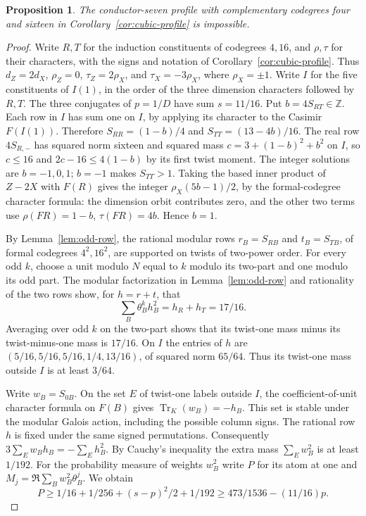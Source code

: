 \documentclass[11pt,a4paper]{article}
\newtheorem{proposition}[theorem]{Proposition}
\numberwithin{equation}{section}
\begin{document}
\begin{proposition}\label{prop:cubic-polar}
The conductor-seven profile with complementary codegrees four and sixteen in Corollary~\ref{cor:cubic-profile} is impossible.
\end{proposition}
\begin{proof}
Write $R,T$ for the induction constituents of codegrees $4,16$, and
$\rho,\tau$ for their characters, with the signs and notation of
Corollary~\ref{cor:cubic-profile}. Thus $d_Z=2d_X$,
$\rho_Z=0$, $\tau_Z=2\rho_X$, and $\tau_X=-3\rho_X$,
where $\rho_X=\pm1$. Write $I$ for the five constituents of $I(1)$,
in the order of the three dimension characters followed by $R,T$.
The three conjugates of $p=1/D$ have sum $s=11/16$.
Put $b=4S_{RT}\in\mathbb Z$. Each row in $I$ has sum one on $I$,
by applying its character to the Casimir $F(I(1))$.
Therefore $S_{RR}=(1-b)/4$ and $S_{TT}=(13-4b)/16$.
The real row $4S_{R,-}$ has squared norm sixteen and squared mass
$c=3+(1-b)^2+b^2$ on $I$, so $c\le16$ and
$2c-16\le4(1-b)$ by its first twist moment. The integer solutions
are $b=-1,0,1$; $b=-1$ makes $S_{TT}>1$.
Taking the based inner product of $Z-2X$ with $F(R)$ gives the integer
$\rho_X(5b-1)/2$, by the formal-codegree character formula: the
dimension orbit contributes zero, and the other two terms use
$\rho(FR)=1-b$, $\tau(FR)=4b$. Hence $b=1$.

By Lemma~\ref{lem:odd-row}, the rational modular rows
$r_B=S_{RB}$ and $t_B=S_{TB}$, of formal codegrees $4^2,16^2$,
are supported on twists of two-power order.
For every odd $k$, choose a unit modulo $N$ equal to $k$ modulo its
two-part and one modulo its odd part. The modular factorization in
Lemma~\ref{lem:odd-row} and rationality of the two rows show, for
$h=r+t$, that
\[
 \sum_B \theta_B^k h_B^2=h_R+h_T=17/16.
\]
Averaging over odd $k$ on the two-part shows that its twist-one mass
minus its twist-minus-one mass is $17/16$.
On $I$ the entries of $h$ are $(5/16,5/16,5/16,1/4,13/16)$, of
squared norm $65/64$. Thus its twist-one mass outside $I$ is at
least $3/64$.

Write $w_B=S_{0B}$. On the set $E$ of twist-one labels outside $I$,
the coefficient-of-unit character formula on $F(B)$ gives
$\operatorname{Tr}_K(w_B)=-h_B$. This set is stable under the
modular Galois action, including the possible column signs.
The rational row $h$ is fixed under the same signed permutations.
Consequently $3\sum_E w_B h_B=-\sum_E h_B^2$. By Cauchy's
inequality the extra mass $\sum_E w_B^2$ is at least $1/192$.
For the probability measure of weights $w_B^2$ write $P$ for its
atom at one and $M_j=\Re\sum_B w_B^2\theta_B^j$. We obtain
\[
 P\ge 1/16+1/256+(s-p)^2/2+1/192
 \ge 473/1536-(11/16)p.
\]


\end{proof}
\end{document}
